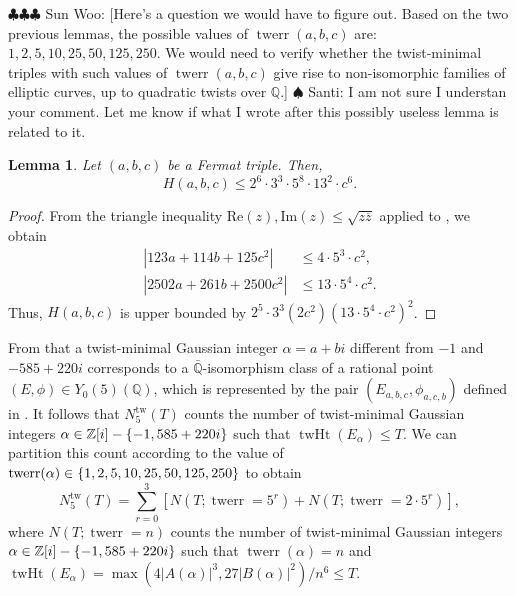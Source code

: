 \documentclass[12pt]{amsart}
\newcounter{counter}[section] %
\numberwithin{equation}{section} %
\newtheorem{lemma}[counter]{Lemma}
\theoremstyle{definition} \newtheorem{definition}[counter]{Definition}
\theoremstyle{remark} \newtheorem{nonexam}[counter]{Non-example}
\newcommand{\ZZ}{\mathbb{Z}} %
\newcommand{\QQ}{\mathbb{Q}} %
\newcommand{\Qbar}{\bar{\QQ}} %
\newcommand{\brk}[1]{\left\lbrace #1 \right\rbrace} %
\renewcommand{\Re}{\mathrm{Re}} %
\renewcommand{\Im}{\mathrm{Im}} %
\newcommand{\ol}{\overline}
\let\originalleft\left \let\originalright\right
\renewcommand{\left}{\mathopen{}\mathclose\bgroup\originalleft}
\renewcommand{\right}{\aftergroup\egroup\originalright}
\newcommand{\santi}[1]{{\color{cyan} \sf
    $\spadesuit$ Santi: #1}}
\newcommand{\spark}[1]{{\color{olive} \sf
    $\clubsuit\clubsuit\clubsuit$ Sun Woo: [#1]}}
\DeclareMathOperator{\tw}{tw} %
\DeclareMathOperator{\twht}{twHt} %
\DeclareMathOperator{\twerr}{twerr} %
\begin{document}
\spark{Here's a question we would have to figure out. Based on the two previous
  lemmas, the possible values of $\twerr(a,b,c)$ are:
  $1, 2, 5, 10, 25, 50, 125, 250$. We would need to verify whether the
  twist-minimal triples with such values of $\twerr(a,b,c)$ give rise to
  non-isomorphic families of elliptic curves, up to quadratic twists over
  $\mathbb{Q}$.} \santi{I am not sure I understan your comment. Let me know if
  what I wrote after this possibly useless lemma is related to it.}
\begin{lemma}
  Let $(a,b,c)$ be a Fermat triple. Then,
  \begin{equation}
    \label{eq:ineq}
    H(a,b,c) \leq 2^6\cdot 3^3\cdot 5^8\cdot 13^2 \cdot c^6.
  \end{equation}
\end{lemma}
\begin{proof}
  From the triangle inequality $\Re(z), \Im(z) \leq \sqrt{z\ol{z}}$ applied to
  , we obtain
  \begin{align*}
    |123a+114b+125c^2| &\leq 4\cdot 5^3\cdot c^2, \\
    |2502a+261b+2500c^2| &\leq 13\cdot 5^4\cdot c^2.
  \end{align*}
  Thus, $H(a,b,c)$ is upper bounded by
  $2^5\cdot 3^3(2c^2)(13\cdot 5^4\cdot c^2)^2$.
\end{proof}

From  that a twist-minimal Gaussian integer $\alpha = a+bi$
different from $-1$ and $-585+220i$ corresponds to a $\Qbar$-isomorphism class of a
rational point $(E,\phi) \in Y_0(5)(\QQ)$, which is represented by the pair
$(E_{a,b,c},\phi_{a,c,b})$ defined in . It follows
that $N_5^{\tw}(T)$ counts the number of twist-minimal Gaussian integers
$\alpha \in \ZZ[i]-\brk{-1,585+220i}$ such that $\twht(E_\alpha) \leq T$. We
can partition this count according to the value of $\twerr(\alpha) \in
\brk{1,2,5,10,25,50,125,250}$ to obtain
\begin{equation*}
  N_5^{\tw}(T) = \sum_{r =0}^3[N(T; \twerr = 5^r) + N(T; \twerr
  = 2\cdot 5^r)],
\end{equation*}
where $N(T;\twerr=n)$ counts the number of twist-minimal Gaussian integers
$\alpha \in \ZZ[i]-\brk{-1,585+220i}$ such that $\twerr(\alpha) = n$ and 
$\twht(E_\alpha) = \max(4|A(\alpha)|^3,27|B(\alpha)|^2)/n^6 \leq T$. 
\end{document}
